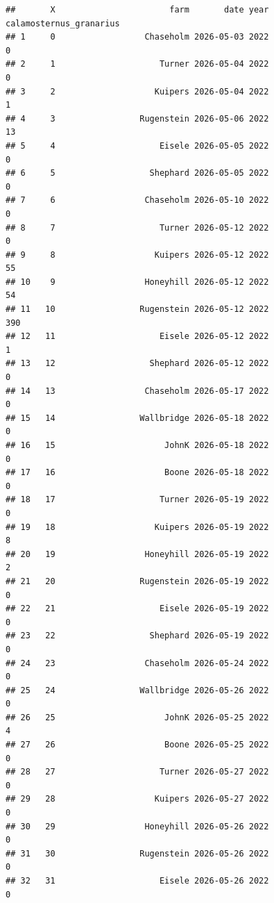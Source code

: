 \documentclass[
]{article}
\begin{document}
\begin{verbatim}
##       X                       farm       date year calamosternus_granarius
## 1     0                  Chaseholm 2026-05-03 2022                       0
## 2     1                     Turner 2026-05-04 2022                       0
## 3     2                    Kuipers 2026-05-04 2022                       1
## 4     3                 Rugenstein 2026-05-06 2022                      13
## 5     4                     Eisele 2026-05-05 2022                       0
## 6     5                   Shephard 2026-05-05 2022                       0
## 7     6                  Chaseholm 2026-05-10 2022                       0
## 8     7                     Turner 2026-05-12 2022                       0
## 9     8                    Kuipers 2026-05-12 2022                      55
## 10    9                  Honeyhill 2026-05-12 2022                      54
## 11   10                 Rugenstein 2026-05-12 2022                     390
## 12   11                     Eisele 2026-05-12 2022                       1
## 13   12                   Shephard 2026-05-12 2022                       0
## 14   13                  Chaseholm 2026-05-17 2022                       0
## 15   14                 Wallbridge 2026-05-18 2022                       0
## 16   15                      JohnK 2026-05-18 2022                       0
## 17   16                      Boone 2026-05-18 2022                       0
## 18   17                     Turner 2026-05-19 2022                       0
## 19   18                    Kuipers 2026-05-19 2022                       8
## 20   19                  Honeyhill 2026-05-19 2022                       2
## 21   20                 Rugenstein 2026-05-19 2022                       0
## 22   21                     Eisele 2026-05-19 2022                       0
## 23   22                   Shephard 2026-05-19 2022                       0
## 24   23                  Chaseholm 2026-05-24 2022                       0
## 25   24                 Wallbridge 2026-05-26 2022                       0
## 26   25                      JohnK 2026-05-25 2022                       4
## 27   26                      Boone 2026-05-25 2022                       0
## 28   27                     Turner 2026-05-27 2022                       0
## 29   28                    Kuipers 2026-05-27 2022                       0
## 30   29                  Honeyhill 2026-05-26 2022                       0
## 31   30                 Rugenstein 2026-05-26 2022                       0
## 32   31                     Eisele 2026-05-26 2022                       0

\end{verbatim}
\end{document}
